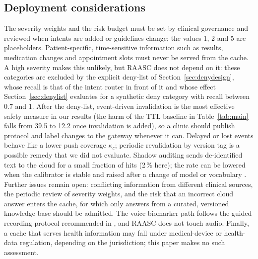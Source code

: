\documentclass[journal]{IEEEtran}
\newcommand{\pct}{\,\%}
\begin{document}
\subsection{Deployment considerations}\label{sec:deploy}
The severity weights and the risk budget must be set by clinical governance and reviewed when intents are added or guidelines change; the values 1, 2 and 5 are placeholders. Patient-specific, time-sensitive information such as results, medication changes and appointment slots must never be served from the cache. A high severity makes this unlikely, but RAASC does not depend on it: these categories are excluded by the explicit deny-list of Section~\ref{sec:denydesign}, whose recall is that of the intent router in front of it and whose effect Section~\ref{sec:denylist} evaluates for a synthetic deny category with recall between 0.7 and 1. After the deny-list, event-driven invalidation is the most effective safety measure in our results (the harm of the TTL baseline in Table~\ref{tab:main} falls from 39.5 to 12.2 once invalidation is added), so a clinic should publish protocol and label changes to the gateway whenever it can. Delayed or lost events behave like a lower push coverage $\kappa_c$; periodic revalidation by version tag is a possible remedy that we did not evaluate. Shadow auditing sends de-identified text to the cloud for a small fraction of hits (2\pct{} here); the rate can be lowered when the calibrator is stable and raised after a change of model or vocabulary \cite{gama2014}. Further issues remain open: conflicting information from different clinical sources, the periodic review of severity weights, and the risk that an incorrect cloud answer \cite{ji2023,singhal2023} enters the cache, for which only answers from a curated, versioned knowledge base should be admitted. The voice-biomarker path follows the guided-recording protocol recommended in \cite{carron2021}, and RAASC does not touch audio. Finally, a cache that serves health information may fall under medical-device or health-data regulation, depending on the jurisdiction; this paper makes no such assessment.
\end{document}
